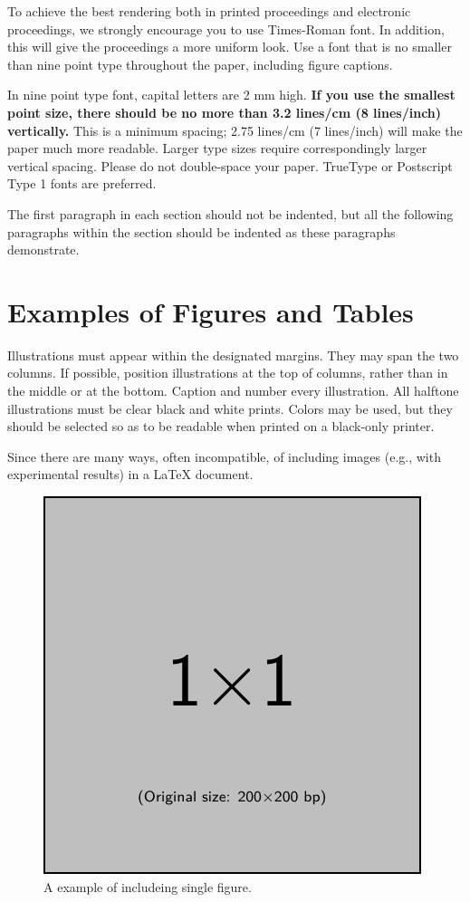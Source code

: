 \documentclass{article}
\begin{document}
To achieve the best rendering both in printed proceedings and electronic proceedings, we
strongly encourage you to use Times-Roman font.  In addition, this will give
the proceedings a more uniform look.  Use a font that is no smaller than nine
point type throughout the paper, including figure captions.

In nine point type font, capital letters are 2 mm high.  \textbf{If you use the
smallest point size, there should be no more than 3.2 lines/cm (8 lines/inch)
vertically.}  This is a minimum spacing; 2.75 lines/cm (7 lines/inch) will make
the paper much more readable.  Larger type sizes require correspondingly larger
vertical spacing.  Please do not double-space your paper.  TrueType or
Postscript Type 1 fonts are preferred.

The first paragraph in each section should not be indented, but all the
following paragraphs within the section should be indented as these paragraphs
demonstrate.


\section{Examples of Figures and Tables}
Illustrations must appear within the designated margins.  They may span the two
columns.  If possible, position illustrations at the top of columns, rather
than in the middle or at the bottom.  Caption and number every illustration.
All halftone illustrations must be clear black and white prints.  Colors may be
used, but they should be selected so as to be readable when printed on a
black-only printer.

Since there are many ways, often incompatible, of including images (e.g., with
experimental results) in a LaTeX document.
\lipsum[3-4]

\begin{figure}[t]
   \centering
   \includegraphics[width=.4\hsize]{figure/example-image-pdf.pdf}
   \caption{A example of includeing single figure.}
\end{figure}
\end{document}
